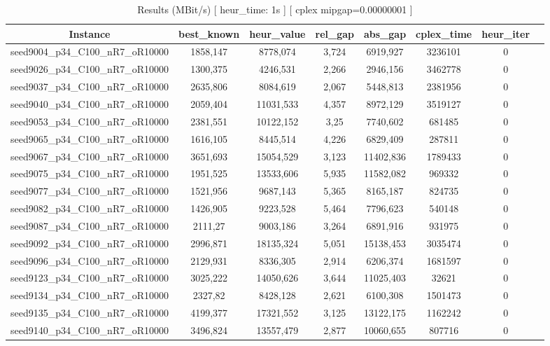 \documentclass[a4paper]{article}
\begin{document}
\begin{center}
\begin{longtable}{cccccccc}
\caption{Results (MBit/s) [ heur\_time: 1s ]  [ cplex mipgap=0.00000001 ]}
\tabularnewline
\hline
Instance & best\_known & heur\_value & rel\_gap & abs\_gap & cplex\_time & heur\_iter\\
\hline
seed9004\_p34\_C100\_nR7\_oR10000 & 1858,147 & 8778,074 & 3,724 & 6919,927 & 3236101 & 0\\
\hline
seed9026\_p34\_C100\_nR7\_oR10000 & 1300,375 & 4246,531 & 2,266 & 2946,156 & 3462778 & 0\\
\hline
seed9037\_p34\_C100\_nR7\_oR10000 & 2635,806 & 8084,619 & 2,067 & 5448,813 & 2381956 & 0\\
\hline
seed9040\_p34\_C100\_nR7\_oR10000 & 2059,404 & 11031,533 & 4,357 & 8972,129 & 3519127 & 0\\
\hline
seed9053\_p34\_C100\_nR7\_oR10000 & 2381,551 & 10122,152 & 3,25 & 7740,602 & 681485 & 0\\
\hline
seed9065\_p34\_C100\_nR7\_oR10000 & 1616,105 & 8445,514 & 4,226 & 6829,409 & 287811 & 0\\
\hline
seed9067\_p34\_C100\_nR7\_oR10000 & 3651,693 & 15054,529 & 3,123 & 11402,836 & 1789433 & 0\\
\hline
seed9075\_p34\_C100\_nR7\_oR10000 & 1951,525 & 13533,606 & 5,935 & 11582,082 & 969332 & 0\\
\hline
seed9077\_p34\_C100\_nR7\_oR10000 & 1521,956 & 9687,143 & 5,365 & 8165,187 & 824735 & 0\\
\hline
seed9082\_p34\_C100\_nR7\_oR10000 & 1426,905 & 9223,528 & 5,464 & 7796,623 & 540148 & 0\\
\hline
seed9087\_p34\_C100\_nR7\_oR10000 & 2111,27 & 9003,186 & 3,264 & 6891,916 & 931975 & 0\\
\hline
seed9092\_p34\_C100\_nR7\_oR10000 & 2996,871 & 18135,324 & 5,051 & 15138,453 & 3035474 & 0\\
\hline
seed9096\_p34\_C100\_nR7\_oR10000 & 2129,931 & 8336,305 & 2,914 & 6206,374 & 1681597 & 0\\
\hline
seed9123\_p34\_C100\_nR7\_oR10000 & 3025,222 & 14050,626 & 3,644 & 11025,403 & 32621 & 0\\
\hline
seed9134\_p34\_C100\_nR7\_oR10000 & 2327,82 & 8428,128 & 2,621 & 6100,308 & 1501473 & 0\\
\hline
seed9135\_p34\_C100\_nR7\_oR10000 & 4199,377 & 17321,552 & 3,125 & 13122,175 & 1162242 & 0\\
\hline
seed9140\_p34\_C100\_nR7\_oR10000 & 3496,824 & 13557,479 & 2,877 & 10060,655 & 807716 & 0\\

\end{longtable}
\end{center}
\end{document}
